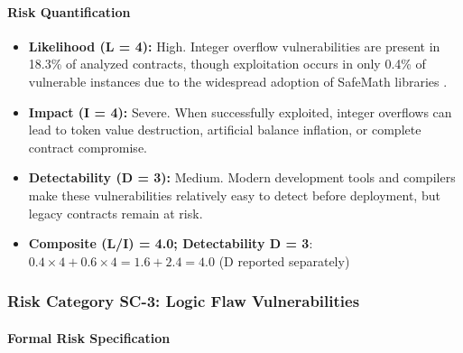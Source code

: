 \paragraph{Risk Quantification}

\begin{itemize}
\item \textbf{Likelihood (L = 4):} High. Integer overflow vulnerabilities are present in 18.3\% of analyzed contracts, though exploitation occurs in only 0.4\% of vulnerable instances due to the widespread adoption of SafeMath libraries \cite{perez2021analysis}.

\item \textbf{Impact (I = 4):} Severe. When successfully exploited, integer overflows can lead to token value destruction, artificial balance inflation, or complete contract compromise.

\item \textbf{Detectability (D = 3):} Medium. Modern development tools and compilers make these vulnerabilities relatively easy to detect before deployment, but legacy contracts remain at risk.

\item \textbf{Composite (L/I) = 4.0; Detectability D = 3}: $0.4 \times 4 + 0.6 \times 4 = 1.6 + 2.4 = 4.0$ (D reported separately)
\end{itemize}

\subsubsection{Risk Category SC-3: Logic Flaw Vulnerabilities}

\paragraph{Formal Risk Specification}

